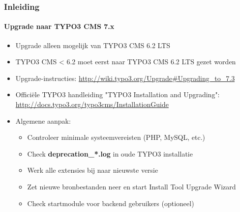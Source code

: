 \begin{frame}[fragile]
	\frametitle{Inleiding}
	\framesubtitle{Upgrade naar TYPO3 CMS 7.x}

	\begin{itemize}
		\item Upgrade alleen mogelijk van TYPO3 CMS 6.2 LTS
		\item TYPO3 CMS < 6.2 moet eerst naar TYPO3 CMS 6.2 LTS gezet worden
	\end{itemize}

	\begin{itemize}

		\item Upgrade-instructies:\newline
			\smaller\url{http://wiki.typo3.org/Upgrade#Upgrading_to_7.3}\normalsize
		\item Officiële TYPO3 handleiding "TYPO3 Installation and Upgrading":
			\smaller\url{http://docs.typo3.org/typo3cms/InstallationGuide}\normalsize
		\item Algemene aanpak:
			\begin{itemize}
				\item Controleer minimale systeemvereisten (PHP, MySQL, etc.)
				\item Check \textbf{deprecation\_*.log} in oude TYPO3 installatie
				\item Werk alle extensies bij naar nieuwste versie
				\item Zet nieuwe bronbestanden neer en start Install Tool \textrightarrow Upgrade Wizard
				\item Check startmodule voor backend gebruikers (optioneel)
			\end{itemize}
	\end{itemize}

\end{frame}

